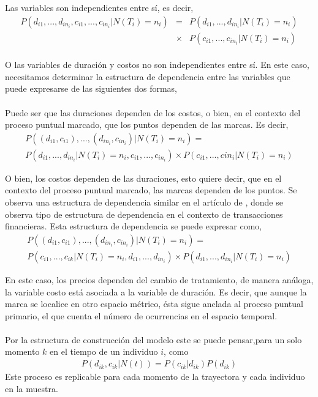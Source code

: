 Las variables son independientes entre s\'i, es decir,
\begin{eqnarray*}
P(d_{i1},...,d_{in_i},c_{i1},...,c_{in_i}|N(T_i)=n_i)&=&P(d_{i1},...,d_{in_i}|N(T_i)=n_i)\\
&\times& P(c_{i1},...,c_{in_i}|N(T_i)=n_i)
\end{eqnarray*}
\\
O las variables de duraci\'on y costos no son independientes entre s\'i. En este caso, necesitamos determinar la estructura de dependencia entre las variables que puede expresarse de las siguientes dos formas,\\
\\
Puede ser que las duraciones dependen de los costos, o bien, en el contexto del proceso puntual marcado, que los puntos dependen de las marcas. Es decir,
\begin{multline*}
	P((d_{i1},c_{i1}),...,(d_{in_i},c_{in_i})|N(T_i)=n_i)= \\
	P(d_{i1},...,d_{in_i}|N(T_i)=n_i,c_{i1},...,c_{in_i})\times P(c_{i1},...,c{in_i}|N(T_i)=n_i)
\end{multline*}

O bien, los costos dependen de las duraciones, esto quiere decir, que en el contexto del proceso puntual marcado, las marcas dependen de los puntos. Se observa una estructura de dependencia similar en el art\'iculo de \cite{engle1998autoregressive}, donde se observa tipo de estructura de dependencia en el contexto de transacciones financieras. Esta estructura de dependencia se puede expresar como,
	\begin{multline*}
     P((d_{i1},c_{i1}),...,(d_{in_i},c_{in_i})|N(T_i)=n_i)=\\
     P(c_{i1},...,c_{ik}|N(T_i)=n_i,d_{i1},...,d_{in_i})\times P(d_{i1},...,d_{in_i}|N(T_i)=n_i)
    \end{multline*}	

En este caso, los precios dependen del cambio de tratamiento, de manera an\'aloga, la variable costo est\'a asociada a la variable de duraci\'on. Es decir, que aunque la marca se localice en otro espacio m\'etrico, \'esta sigue anclada al proceso puntual primario, el que cuenta el n\'umero de ocurrencias en el espacio temporal.\\
\\
Por la estructura de construcci\'on del modelo este se puede pensar,para un solo momento $k$ en el tiempo de un individuo $i$, como
\begin{align}
P(d_{ik},c_{ik}|N(t)) = P(c_{ik}|d_{ik})P(d_{ik})
\end{align}
Este proceso es replicable para cada momento de la trayectora y cada individuo en la muestra.
